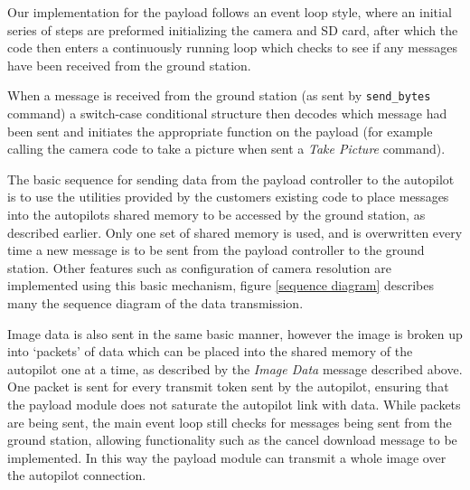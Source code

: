 Our implementation for the payload follows an event loop style, where an initial series of 
steps are preformed initializing the camera and SD card, after which the code then enters a continuously
running loop which checks to see if any messages have been received from the ground station.

When a message is received from the ground station (as sent by \verb+send_bytes+ command) a switch-case
conditional structure then decodes which message had been sent and
initiates the appropriate function on the payload (for example calling the camera code to take a picture when sent
a \emph{Take Picture} command).



The basic sequence for sending data from the payload controller to the autopilot is to use the utilities provided 
by the customers existing code to place messages into the autopilots shared memory to be accessed by the
ground station, as described earlier. Only one set of shared memory is used, and is overwritten every time 
a new message is to be sent from the payload controller to the ground station.
Other features such as configuration of camera resolution are implemented using this basic mechanism, figure \ref{sequence diagram} describes many the sequence diagram of the data transmission.

Image data is also sent in the same basic manner, however the image is broken up into `packets' of data
which can be placed into the shared memory of the autopilot one at a time, as described by the \emph{Image Data}
message described above. One packet is sent for every transmit token sent by the autopilot, ensuring that the
payload module does not saturate the autopilot link with data. While packets are being sent, the main event loop
still checks for messages being sent from the ground station, allowing functionality such as the cancel download message 
to be implemented. In this way the payload module can transmit a whole image over the autopilot connection.

